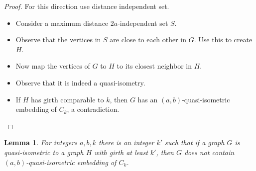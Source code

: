 \documentclass[a4paper]{article}
\newtheorem{lemma}{Lemma}
\begin{document}
\begin{proof}
	For this direction use distance independent set. 
	
	\begin{itemize}
		\item Consider a maximum distance $2a$-independent set $S$.
		 
		 \item Observe that the  vertices in $S$ are close to each other in $G$. Use this to create $H$.
		 
		 \item Now map the vertices of $G$ to $H$ to its closest neighbor in $H$. 
		 
		 \item Observe that it is indeed a quasi-isometry.
		 
		 \item If $H$ has girth comparable to $k$, then $G$ has an $(a,b)$-quasi-isometric embedding of $C_k$, a contradiction.
	\end{itemize}
\end{proof}


\begin{lemma}
	For integers $a,b,k$ there is an integer $k'$ such that if a graph $G$ is quasi-isometric to a graph $H$ with girth at least $k'$, then $G$ does not contain $(a,b)$-quasi-isometric embedding of $C_k$. 
\end{lemma}
\end{document}
